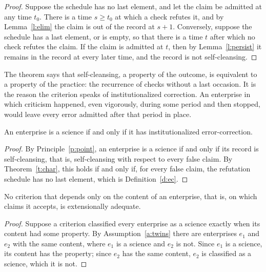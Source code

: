 \documentclass{situationist-preprint}
\begin{document}
\begin{proof}
Suppose the schedule has no last element, and let the claim be admitted at any time $t_0$. There is a time $s \ge t_0$ at which a check refutes it, and by Lemma~\ref{l:elim} the claim is out of the record at $s+1$. Conversely, suppose the schedule has a last element, or is empty, so that there is a time $t$ after which no check refutes the claim. If the claim is admitted at $t$, then by Lemma~\ref{l:persist} it remains in the record at every later time, and the record is not self-cleansing.
\end{proof}

The theorem says that self-cleansing, a property of the outcome, is equivalent to a property of the practice: the recurrence of checks without a last occasion. It is the reason the criterion speaks of institutionalized correction. An enterprise in which criticism happened, even vigorously, during some period and then stopped, would leave every error admitted after that period in place.

\begin{theorem}[Demarcation]\label{t:dem}
An enterprise is a science if and only if it has institutionalized error-correction.
\end{theorem}

\begin{proof}
By Principle~\ref{p:point}, an enterprise is a science if and only if its record is self-cleansing, that is, self-cleansing with respect to every false claim. By Theorem~\ref{t:char}, this holds if and only if, for every false claim, the refutation schedule has no last element, which is Definition~\ref{d:ec}.
\end{proof}

\begin{proposition}\label{p:content}
No criterion that depends only on the content of an enterprise, that is, on which claims it accepts, is extensionally adequate.
\end{proposition}

\begin{proof}
Suppose a criterion classified every enterprise as a science exactly when its content had some property. By Assumption~\ref{a:twins} there are enterprises $e_1$ and $e_2$ with the same content, where $e_1$ is a science and $e_2$ is not. Since $e_1$ is a science, its content has the property; since $e_2$ has the same content, $e_2$ is classified as a science, which it is not.
\end{proof}
\end{document}
